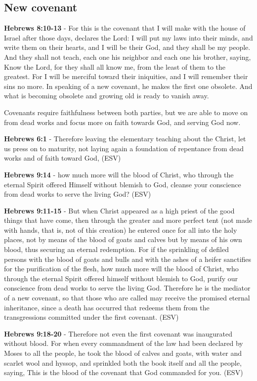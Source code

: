 \documentclass[11pt]{article}
\begin{document}
\subsection{New covenant}
\label{sec:org4918925}
\textbf{Hebrews 8:10-13} - For this is the covenant that I will make with the house of Israel after those days, declares the Lord: I will put my laws into their minds, and write them on their hearts, and I will be their God, and they shall be my people. And they shall not teach, each one his neighbor and each one his brother, saying, Know the Lord, for they shall all know me, from the least of them to the greatest. For I will be merciful toward their iniquities, and I will remember their sins no more. In speaking of a new covenant, he makes the first one obsolete. And what is becoming obsolete and growing old is ready to vanish away.

Covenants require faithfulness between both parties, but we are able to move on from dead works and focus more on faith towards God, and serving God now.

\textbf{Hebrews 6:1} - Therefore leaving the elementary teaching about the Christ, let us press on to maturity, not laying again a foundation of repentance from dead works and of faith toward God, (ESV)

\textbf{Hebrews 9:14} - how much more will the blood of Christ, who through the eternal Spirit offered Himself without blemish to God, cleanse your conscience from dead works to serve the living God? (ESV)

\textbf{Hebrews 9:11-15} - But when Christ appeared as a high priest of the good things that have come, then through the greater and more perfect tent (not made with hands, that is, not of this creation) he entered once for all into the holy places, not by means of the blood of goats and calves but by means of his own blood, thus securing an eternal redemption. For if the sprinkling of defiled persons with the blood of goats and bulls and with the ashes of a heifer sanctifies for the purification of the flesh, how much more will the blood of Christ, who through the eternal Spirit offered himself without blemish to God, purify our conscience from dead works to serve the living God. Therefore he is the mediator of a new covenant, so that those who are called may receive the promised eternal inheritance, since a death has occurred that redeems them from the transgressions committed under the first covenant. (ESV)

\textbf{Hebrews 9:18-20} - Therefore not even the first covenant was inaugurated without blood. For when every commandment of the law had been declared by Moses to all the people, he took the blood of calves and goats, with water and scarlet wool and hyssop, and sprinkled both the book itself and all the people, saying, This is the blood of the covenant that God commanded for you. (ESV)
\end{document}
